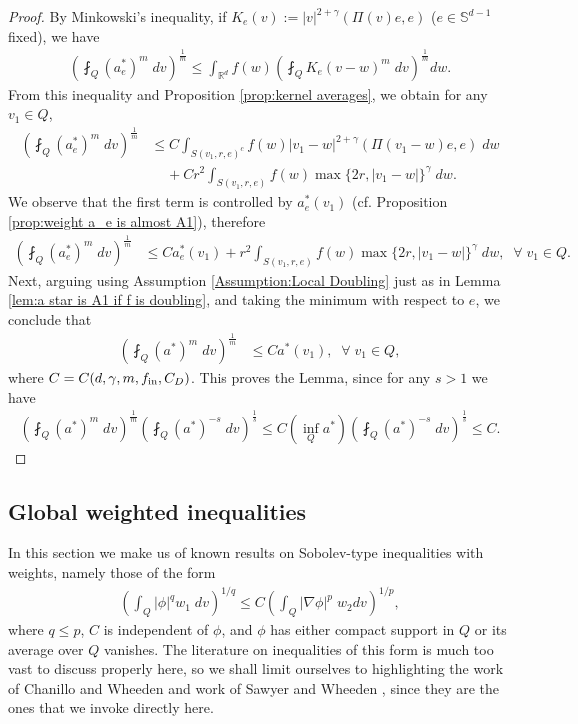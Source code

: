 \documentclass[12pt,american]{amsart}
\numberwithin{equation}{section}
\theoremstyle{plain}
\theoremstyle{definition}                  %
\def\astar{{a^*}}
\def\fin{f_{\textnormal{in}}}
\begin{document}
\begin{proof}
  By Minkowski's inequality, if $K_e(v) := |v|^{2+\gamma} \left( \Pi(v)e,e\right)$ ($e\in\mathbb{S}^{d-1}$ fixed), we have
  \begin{align*}
    \left ( \fint_{Q}(a^*_{e})^m\;dv\right )^{\frac{1}{m}} \leq \int_{\mathbb{R}^d}f(w)\left ( \fint_{Q}K_e(v-w)^m\;dv\right )^{\frac{1}{m}}dw.
  \end{align*}
  From this inequality and Proposition \ref{prop:kernel averages}, we obtain for any $v_1 \in Q$,
  \begin{align*}
   \left ( \fint_{Q}(a^*_e)^m\;dv \right )^{\frac{1}{m}}& \leq C\int_{S(v_1,r,e)^c}f(w)|v_1-w|^{2+\gamma}(\Pi(v_1-w)e,e)\;dw\\
   & \;\;\;\;+Cr^2\int_{S(v_1,r,e)}f(w)\max\{2r,|v_1-w|\}^{\gamma }\;dw.
  \end{align*}
  We observe that the first term is controlled by $a^*_e(v_1)$ (cf. Proposition \ref{prop:weight a_e is almost A1}), therefore
  \begin{align*}
   \left ( \fint_{Q}(a^*_e)^m\;dv\right )^{\frac{1}{m}} & \leq Ca^*_e(v_1)+r^2\int_{S(v_1,r,e)}f(w)\max\{2r,|v_1-w|\}^\gamma\;dw,\;\;\forall\;v_1\in Q.
  \end{align*}
  Next, arguing using Assumption \ref{Assumption:Local Doubling} just as in Lemma \ref{lem:a star is A1 if f is doubling}, and taking the minimum with respect to $e$, we conclude that
  \begin{align*}
   \left ( \fint_{Q}(\astar)^m\;dv\right )^{\frac{1}{m}} & \leq C\astar(v_1),\;\;\forall\;v_1\in Q,
  \end{align*}
  where $C=C(d,\gamma,m,\fin,C_D)$. This proves the Lemma, since for any $s>1$ we have
  \begin{align*}
    \left ( \fint_{Q}(\astar)^m\;dv\right )^{\frac{1}{m}} \left ( \fint_{Q}(\astar)^{-s}\;dv \right )^{\frac{1}{s}} \leq C\left ( \inf \limits_{Q} \astar \right )\left ( \fint_{Q}(\astar)^{-s}\;dv \right )^{\frac{1}{s}}\leq C.	
  \end{align*}
\end{proof}

\subsection{Global weighted inequalities} In this section we make us of known results on Sobolev-type inequalities with weights, namely those of the form
  \begin{align}\label{eqn:weighted Sobolev}
    \left( \int_{Q}|\phi|^qw_1\;dv\right)^{1/q}\leq C\left( \int_{Q} |\nabla \phi|^p\;w_2dv\right)^{1/p},
  \end{align} 
  where $q\leq p$, $C$ is independent of $\phi$, and $\phi$ has either compact support in $Q$ or its average over $Q$ vanishes. The literature on inequalities of this form is much too vast to discuss properly here, so we shall limit ourselves to highlighting the work of Chanillo and Wheeden \cite{ChanilloWheeden1985,ChanilloWheeden1985II} and work of Sawyer and Wheeden \cite{SawWhe1992}, since they are the ones that we invoke directly here.
  
\end{document}
